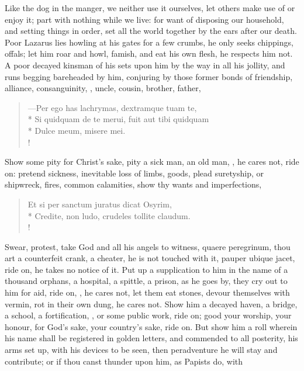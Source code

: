 {Like the dog in the manger, we neither use it ourselves, let others
make use of or enjoy it; part with nothing while we live: for want of
disposing our household, and setting things in order, set all the world
together by the ears after our death. Poor Lazarus lies howling at his
gates for a few crumbs, he only seeks chippings, offals; let him roar
and howl, famish, and eat his own flesh, he respects him not. A poor
decayed kinsman of his sets upon him by the way in all his jollity, and
runs begging bareheaded by him, conjuring by those former bonds of
friendship, alliance, consanguinity, \etc{}, uncle, cousin, brother,
father,
%
\begin{latin}
\begin{verse}
---Per ego has lachrymas, dextramque tuam te,\\*
Si quidquam de te merui, fuit aut tibi quidquam\\*
Dulce meum, misere mei.\\!
\end{verse}
\end{latin}
%
Show some pity for Christ's sake, pity a sick man, an old man, \etc{}, he
cares not, ride on: pretend sickness, inevitable loss of limbs, goods,
plead suretyship, or shipwreck, fires, common calamities, show thy
wants and imperfections,
%
\begin{latin}
\begin{verse}
Et si per sanctum juratus dicat Osyrim,\\*
Credite, non ludo, crudeles tollite claudum.\\!
\end{verse}
\end{latin}
%
Swear, protest, take God and all his angels to witness, quaere
peregrinum, thou art a counterfeit crank, a cheater, he is not touched
with it, pauper ubique jacet, ride on, he takes no notice of it. Put up
a supplication to him in the name of a thousand orphans, a hospital, a
spittle, a prison, as he goes by, they cry out to him for aid, ride on,
, he cares not, let them eat stones, devour themselves with
vermin, rot in their own dung, he cares not. Show him a decayed haven,
a bridge, a school, a fortification, \etc{}, or some public work, ride
on; good your worship, your honour, for God's sake, your country's
sake, ride on. But show him a roll wherein his name shall be registered
in golden letters, and commended to all posterity, his arms set up,
with his devices to be seen, then peradventure he will stay and
contribute; or if thou canst thunder upon him, as Papists do, with
}
